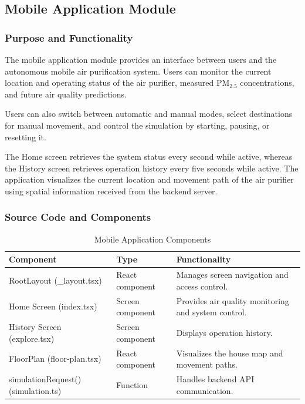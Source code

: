 \documentclass[conference]{IEEEtran}
\newlength{\tablebodywidth}
\newcommand{\pmfine}{\ensuremath{\mathrm{PM}_{2.5}}}
\begin{document}
\subsection{Mobile Application Module \cite{ref7,ref8}}

\subsubsection{Purpose and Functionality}

The mobile application module provides an interface between users and the autonomous mobile air purification system. Users can monitor the current location and operating status of the air purifier, measured \pmfine{} concentrations, and future air quality predictions.

Users can also switch between automatic and manual modes, select destinations for manual movement, and control the simulation by starting, pausing, or resetting it.

The Home screen retrieves the system status every second while active, whereas the History screen retrieves operation history every five seconds while active. The application visualizes the current location and movement path of the air purifier using spatial information received from the backend server.

\subsubsection{Source Code and Components}

\begin{table}[!t]
\caption{Mobile Application Components}
\label{tab:t4}
\centering\footnotesize
\setlength{\tabcolsep}{3pt}
\setlength{\tablebodywidth}{\dimexpr\columnwidth-18pt\relax}
\begin{tabular}{>{\raggedright\arraybackslash}p{0.370\tablebodywidth}>{\raggedright\arraybackslash}p{0.200\tablebodywidth}>{\raggedright\arraybackslash}p{0.430\tablebodywidth}}
\toprule
\textbf{Component} & \textbf{Type} & \textbf{Functionality} \\
\midrule
RootLayout (\_\allowbreak{}layout.tsx) & React component & Manages screen navigation and access control. \\
Home Screen (index.tsx) & Screen component & Provides air quality monitoring and system control. \\
History Screen (explore.tsx) & Screen component & Displays operation history. \\
FloorPlan (floor-plan.tsx) & React component & Visualizes the house map and movement paths. \\
simulationRequest() (simulation.ts) & Function & Handles backend API communication. \\
\bottomrule
\end{tabular}
\end{table}
\end{document}
